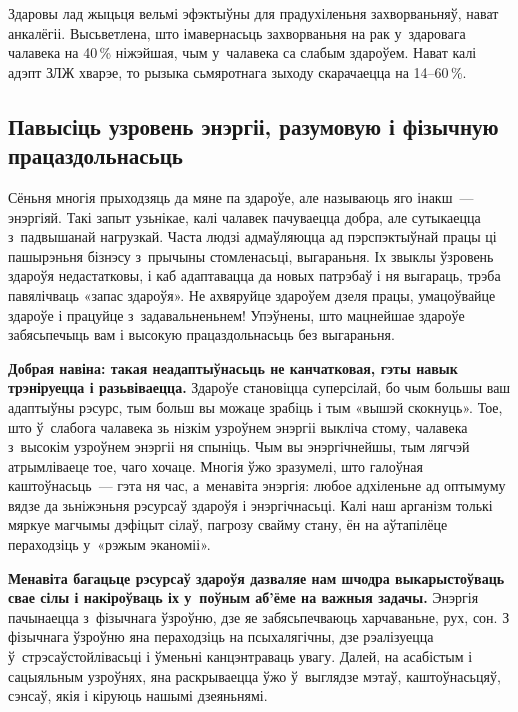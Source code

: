 Здаровы лад жыцьця вельмі эфэктыўны для прадухіленьня захворваньняў, нават анкалёгіі. Высьветлена, што імавернасьць захворваньня на рак у~здаровага чалавека на 40\,\% ніжэйшая, чым у~чалавека са слабым здароўем. Нават калі адэпт ЗЛЖ хварэе, то рызыка сьмяротнага зыходу скарачаецца на 14--60\,\%.

\subsection*{Павысіць узровень энэргіі, разумовую і фізычную працаздольнасьць} 
Сёньня многія прыходзяць да мяне па здароўе, але называюць яго інакш~--- энэргіяй. Такі запыт узьнікае, калі чалавек пачуваецца добра, але сутыкаецца з~падвышанай нагрузкай. Часта людзі адмаўляюцца ад пэрспэктыўнай працы ці пашырэньня бізнэсу з~прычыны стомленасьці, выгараньня. Іх звыклы ўзровень здароўя недастатковы, і каб адаптавацца да новых патрэбаў і ня выгараць, трэба павялічваць «запас здароўя». Не ахвяруйце здароўем дзеля працы, умацоўвайце здароўе і працуйце з~задавальненьнем! Упэўнены, што мацнейшае здароўе забясьпечыць вам і высокую працаздольнасьць без выгараньня.

\textbf{Добрая навіна: такая неадаптыўнасьць не канчатковая, гэты навык трэніруецца і разьвіваецца.} Здароўе становіцца суперсілай, бо чым большы ваш адаптыўны рэсурс, тым больш вы можаце зрабіць і тым «вышэй скокнуць». Тое, што ў~слабога чалавека зь нізкім узроўнем энэргіі выкліча стому, чалавека з~высокім узроўнем энэргіі ня спыніць. Чым вы энэргічнейшы, тым лягчэй атрымліваеце тое, чаго хочаце. Многія ўжо зразумелі, што галоўная каштоўнасьць~--- гэта ня час, а~менавіта энэргія: любое адхіленьне ад оптымуму вядзе да зьніжэньня рэсурсаў здароўя і энэргічнасьці. Калі наш арганізм толькі мяркуе магчымы дэфіцыт сілаў, пагрозу свайму стану, ён на аўтапілёце пераходзіць у~«рэжым эканоміі».

\textbf{Менавіта багацьце рэсурсаў здароўя дазваляе нам шчодра выкарыстоўваць свае сілы і накіроўваць іх у~поўным аб'ёме на важныя задачы.} Энэргія пачынаецца з~фізычнага ўзроўню, дзе яе забясьпечваюць харчаваньне, рух, сон. З фізычнага ўзроўню яна пераходзіць на псыхалягічны, дзе рэалізуецца ў~стрэсаўстойлівасьці і ўменьні канцэнтраваць увагу. Далей, на асабістым і сацыяльным узроўнях, яна раскрываецца ўжо ў~выглядзе мэтаў, каштоўнасьцяў, сэнсаў, якія і кіруюць нашымі дзеяньнямі.



